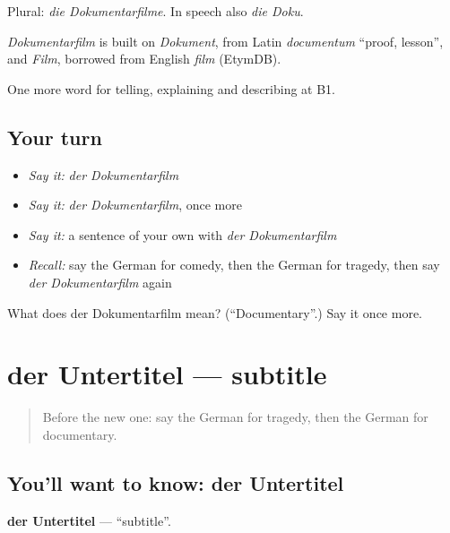 Plural: \emph{die Dokumentarfilme}. In speech also \emph{die Doku}.

\begin{cousinweb}
\emph{Dokumentarfilm} is built on \emph{Dokument}, from Latin \emph{documentum} \textquotedblleft{}proof, lesson\textquotedblright{}, and \emph{Film}, borrowed from English \emph{film} (EtymDB).
\end{cousinweb}

\begin{grammarlens}[title={What you've built}]
One more word for telling, explaining and describing at B1.
\end{grammarlens}

\subsection*{Your turn}
\begin{itemize}
\raggedright
  \item \emph{Say it:} \emph{der Dokumentarfilm}
  \item \emph{Say it:} \emph{der Dokumentarfilm}, once more
  \item \emph{Say it:} a sentence of your own with \emph{der Dokumentarfilm}
  \item \emph{Recall:} say the German for comedy, then the German for tragedy, then say \emph{der Dokumentarfilm} again
\end{itemize}

\begin{tcolorbox}[breakable,colback=teal!4,colframe=teal!35!black,title={Before you move on}]
What does der Dokumentarfilm mean? (\textquotedblleft{}Documentary\textquotedblright{}.) Say it once more.
\end{tcolorbox}
\section[der Untertitel]{der Untertitel — subtitle}

\label{lesson:GE-C524-untertitel}



\begin{quote}
Before the new one: say the German for tragedy, then the German for documentary.
\end{quote}

\subsection*{You'll want to know: der Untertitel}
\textbf{der Untertitel} — \textquotedblleft{}subtitle\textquotedblright{}.

